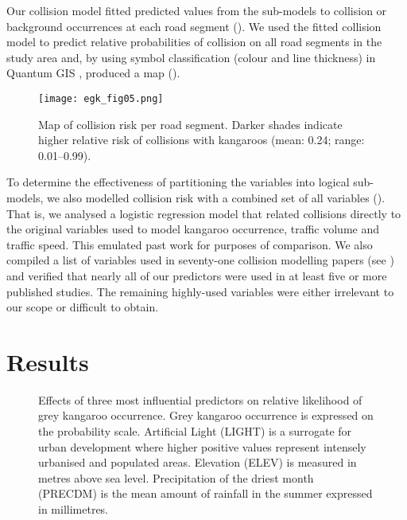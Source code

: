 Our collision model fitted predicted values from the sub-models to collision or background occurrences at each road segment (). We used the fitted collision model to predict relative probabilities of collision on all road segments in the study area and, by using symbol classification (colour and line thickness) in Quantum GIS \citep{qgis09}, produced a map ().

\begin{figure*}[htp]
  \centering
  \texttt{[image: egk\_fig05.png]}
  \caption[Map of collision risk per road segment in Victoria]{Map of collision risk per road segment. Darker shades indicate higher relative risk of collisions with kangaroos (mean: 0.24; range: 0.01--0.99).}
  \label{egk_collmap}
\end{figure*}

To determine the effectiveness of partitioning the variables into logical sub-models, we also modelled collision risk with a combined set of all variables (). That is, we analysed a logistic regression model that related collisions directly to the original variables used to model kangaroo occurrence, traffic volume and traffic speed. This emulated past work for purposes of comparison. We also compiled a list of variables used in seventy-one collision modelling papers (see ) and verified that nearly all of our predictors were used in at least five or more published studies. The remaining highly-used variables were either irrelevant to our scope or difficult to obtain.

\section{Results}

\begin{figure*}[htp]
  \centering
  \caption[Effects of predictors on relative likelihood of grey kangaroo occurrence]{Effects of three most influential predictors on relative likelihood of grey kangaroo occurrence. Grey kangaroo occurrence  is expressed on the probability scale. Artificial Light (LIGHT) is a surrogate for urban development where higher positive values represent intensely urbanised and populated areas. Elevation (ELEV) is measured in metres above sea level. Precipitation of the driest month (PRECDM) is the mean amount of rainfall in the summer expressed in millimetres.}
  \label{egk_sdm_vars}
\end{figure*}

